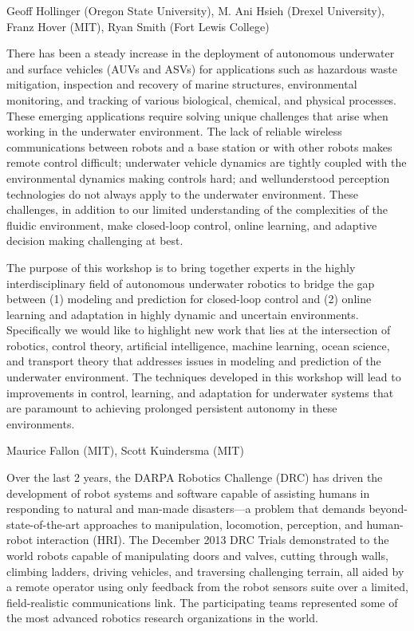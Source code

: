 \begin{spacing}{1.0}
%
{Geoff Hollinger (Oregon State University), M. Ani Hsieh (Drexel University), Franz Hover (MIT), Ryan Smith (Fort Lewis College)}
{
There has been a steady increase in the deployment of autonomous underwater and surface vehicles (AUVs and ASVs) for applications such as hazardous waste mitigation, inspection and recovery of marine structures, environmental monitoring, and tracking of various biological, chemical, and physical processes. These emerging applications require solving unique challenges that arise when working in the underwater environment. The lack of reliable wireless communications between robots and a base station or with other robots makes remote control difficult; underwater vehicle dynamics are tightly coupled with the environmental dynamics making controls hard; and wellunderstood perception technologies do not always apply to the underwater environment. These challenges, in addition to our limited understanding of the complexities of the fluidic environment, make closed-loop control, online learning, and adaptive decision making challenging at best. 

The purpose of this workshop is to bring together experts in the highly interdisciplinary field of autonomous underwater robotics to bridge the gap between (1) modeling and prediction for closed-loop control and (2) online learning and adaptation in highly dynamic and uncertain environments. Specifically we would like to highlight new work that lies at the intersection of robotics, control theory, artificial intelligence, machine learning, ocean science, and transport theory that addresses issues in modeling and prediction of the underwater environment. The techniques developed in this workshop will lead to improvements in control, learning, and adaptation for underwater systems that are paramount to achieving prolonged persistent autonomy in these environments. 
}


{Maurice Fallon (MIT), Scott Kuindersma (MIT)}
{
Over the last 2 years, the DARPA Robotics Challenge (DRC) has driven the development of robot systems and software capable of assisting humans in responding to natural and man-made disasters—a problem that demands beyond-state-of-the-art approaches to manipulation, locomotion, perception, and human-robot interaction (HRI). The December 2013 DRC Trials demonstrated to the world robots capable of manipulating doors and valves, cutting through walls, climbing ladders, driving vehicles, and traversing challenging terrain, all aided by a remote operator using only feedback from the robot sensors suite over a limited, field-realistic communications link. The participating teams represented some of the most advanced robotics research organizations in the world.

}
\end{spacing}
